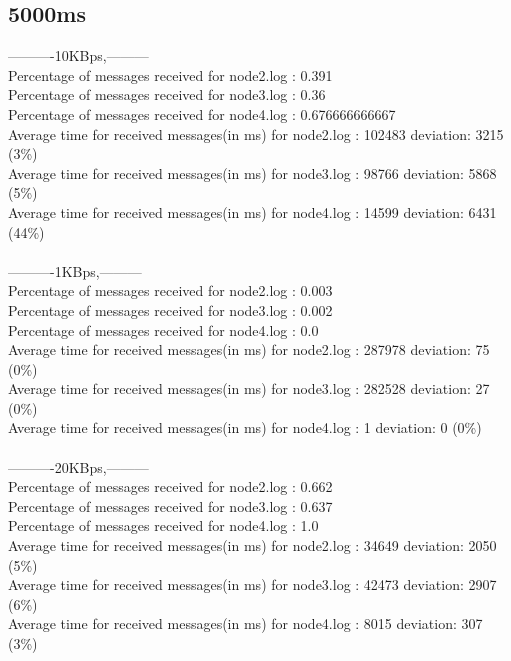     \subsection{5000ms}\label{RawResults:5000ms}
        ----------10KBps,---------\\
        Percentage of messages received for node2.log : 0.391\\
        Percentage of messages received for node3.log : 0.36\\
        Percentage of messages received for node4.log : 0.676666666667\\
        Average time for received messages(in ms) for  node2.log : 102483 	deviation: 3215 (3\%)\\
        Average time for received messages(in ms) for  node3.log : 98766 	deviation: 5868 (5\%)\\
        Average time for received messages(in ms) for  node4.log : 14599 	deviation: 6431 (44\%)\\\\
        ----------1KBps,---------\\
        Percentage of messages received for node2.log : 0.003\\
        Percentage of messages received for node3.log : 0.002\\
        Percentage of messages received for node4.log : 0.0\\
        Average time for received messages(in ms) for  node2.log : 287978 	deviation: 75 (0\%)\\
        Average time for received messages(in ms) for  node3.log : 282528 	deviation: 27 (0\%)\\
        Average time for received messages(in ms) for  node4.log : 1 	deviation: 0 (0\%)\\\\
        ----------20KBps,---------\\
        Percentage of messages received for node2.log : 0.662\\
        Percentage of messages received for node3.log : 0.637\\
        Percentage of messages received for node4.log : 1.0\\
        Average time for received messages(in ms) for  node2.log : 34649 	deviation: 2050 (5\%)\\
        Average time for received messages(in ms) for  node3.log : 42473 	deviation: 2907 (6\%)\\
        Average time for received messages(in ms) for  node4.log : 8015 	deviation: 307 (3\%)\\\\

